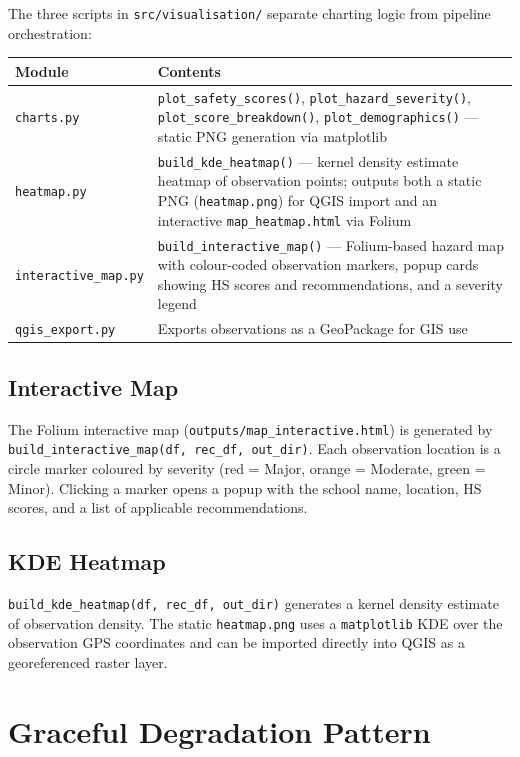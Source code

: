\documentclass[11pt,a4paper,openany]{book}
\begin{document}
The three scripts in \texttt{src/visualisation/} separate charting logic from
pipeline orchestration:

\begin{center}
\begin{tabular}{lL{9.5cm}}
\toprule
Module & Contents \\
\midrule
\texttt{charts.py} & \texttt{plot\_safety\_scores()}, \texttt{plot\_hazard\_severity()},
  \texttt{plot\_score\_breakdown()}, \texttt{plot\_demographics()} ---
  static PNG generation via matplotlib \\
\texttt{heatmap.py} & \texttt{build\_kde\_heatmap()} --- kernel density estimate
  heatmap of observation points; outputs both a static PNG (\texttt{heatmap.png})
  for QGIS import and an interactive \texttt{map\_heatmap.html} via Folium \\
\texttt{interactive\_map.py} & \texttt{build\_interactive\_map()} --- Folium-based
  hazard map with colour-coded observation markers, popup cards showing HS scores
  and recommendations, and a severity legend \\
\texttt{qgis\_export.py} & Exports observations as a GeoPackage for GIS use \\
\bottomrule
\end{tabular}
\end{center}

\subsection{Interactive Map}

The Folium interactive map (\texttt{outputs/map\_interactive.html}) is generated by
\texttt{build\_interactive\_map(df, rec\_df, out\_dir)}.  Each observation location
is a circle marker coloured by severity (red = Major, orange = Moderate, green = Minor).
Clicking a marker opens a popup with the school name, location, HS scores, and a list
of applicable recommendations.

\subsection{KDE Heatmap}

\texttt{build\_kde\_heatmap(df, rec\_df, out\_dir)} generates a kernel density estimate
of observation density.  The static \texttt{heatmap.png} uses a
\texttt{matplotlib} KDE over the observation GPS coordinates and can be imported
directly into QGIS as a georeferenced raster layer.

\section{Graceful Degradation Pattern}
\end{document}
